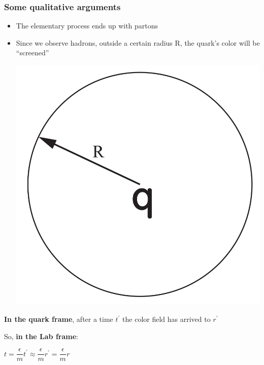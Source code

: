 \documentclass[9pt, xcolor=dvipsnames]{beamer}
\begin{document}
\begin{frame}
\frametitle{Some qualitative arguments}
\begin{itemize}
 \item The elementary process ends up with partons
\pause
\item Since we observe hadrons, outside a certain radius R, the quark's color will be ``screened''
\begin{center}
\includegraphics[scale=0.1]{color}
\end{center}
\end{itemize}
\pause
\textbf{In the quark frame}, after a time $t^{'}$ the color field has arrived to $r^{'}$

So, \textbf{in the Lab frame}:
\begin{center}
$t=\dfrac{\epsilon}{m}t^{'}\approx\dfrac{\epsilon}{m}r^{'}=\dfrac{\epsilon}{m}r$
\end{center}

\end{frame}
\end{document}
